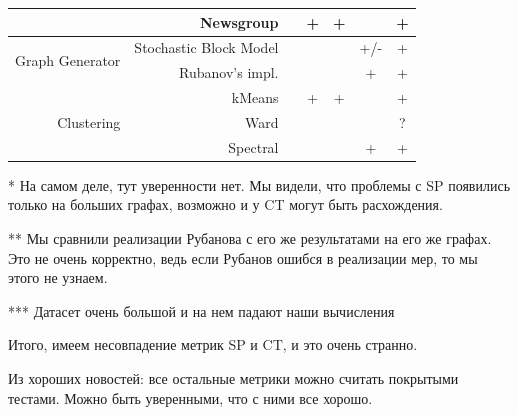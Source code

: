 \documentclass{article}
\begin{document}
\begin{table}[H]
\begin{tabular}{rr|cccc|c}
                & Newsgroup                &            & +        & +      &             & +      \\
                \hline
\multirow{2}{*}{Graph Generator} & Stochastic Block Model &  &     &        & \cellcolor{yellow!25} +/- & \cellcolor{yellow!25} + \\
                & Rubanov's impl.          &            &          &        & +           & +      \\
                \hline
\multirow{3}{*}{Clustering} & kMeans       &            & +        & +      &             & +      \\
                & Ward                     &            &          &        &             & \cellcolor{yellow!25} ? \\
                & Spectral                 &            &          &        & +           & +
\end{tabular}
\end{table}

{
\small
* На самом деле, тут уверенности нет. Мы видели, что проблемы с SP появились только на больших графах, возможно и у CT могут быть расхождения.

** Мы сравнили реализации Рубанова с его же результатами на его же графах. Это не очень корректно, ведь если Рубанов ошибся в реализации мер, то мы этого не узнаем.

*** Датасет очень большой и на нем падают наши вычисления
}

\medskip

Итого, имеем несовпадение метрик SP и CT, и это очень странно. 

Из хороших новостей: все остальные метрики можно считать покрытыми тестами. Можно быть уверенными, что с ними все хорошо.
\end{document}
